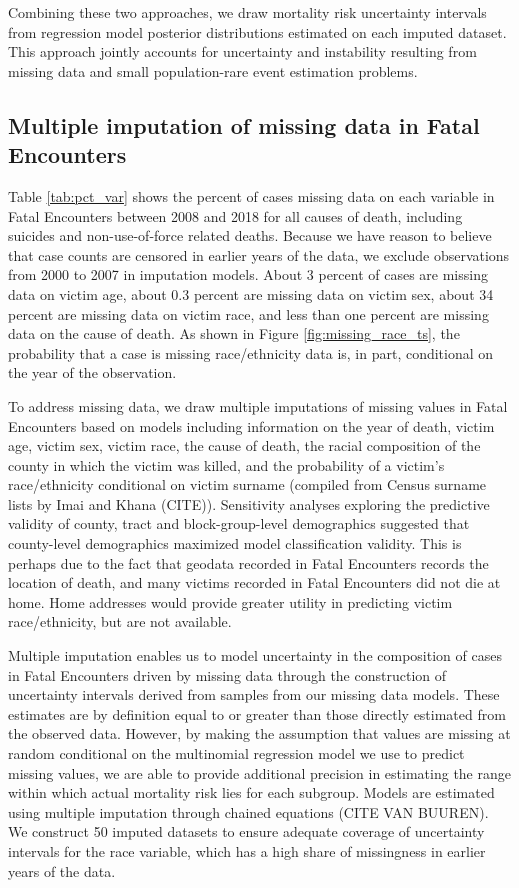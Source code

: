 \documentclass{article}
\begin{document}
Combining these two approaches, we draw mortality risk uncertainty intervals from regression model posterior distributions estimated on each imputed dataset. This approach jointly accounts for uncertainty and instability resulting from missing data and small population-rare event estimation problems. 

\subsection{Multiple imputation of missing data in Fatal Encounters}

Table \ref{tab:pct_var} shows the percent of cases missing data on each variable in Fatal Encounters between 2008 and 2018 for all causes of death, including suicides and non-use-of-force related deaths. Because we have reason to believe that case counts are censored in earlier years of the data, we exclude observations from 2000 to 2007 in imputation models. About 3 percent of cases are missing data on victim age, about 0.3 percent are missing data on victim sex, about 34 percent are missing data on victim race, and less than one percent are missing data on the cause of death. As shown in Figure \ref{fig:missing_race_ts}, the probability that a case is missing race/ethnicity data is, in part, conditional on the year of the observation. 



To address missing data, we draw multiple imputations of missing values in Fatal Encounters based on models including information on the year of death, victim age, victim sex, victim race, the cause of death, the racial composition of the county in which the victim was killed, and the probability of a victim's race/ethnicity conditional on victim surname (compiled from Census surname lists by Imai and Khana (CITE)). Sensitivity analyses exploring the predictive validity of county, tract and block-group-level demographics suggested that county-level demographics maximized model classification validity. This is perhaps due to the fact that geodata recorded in Fatal Encounters records the location of death, and many victims recorded in Fatal Encounters did not die at home. Home addresses would provide greater utility in predicting victim race/ethnicity, but are not available. 

Multiple imputation enables us to model uncertainty in the composition of cases in Fatal Encounters driven by missing data through the construction of uncertainty intervals derived from samples from our missing data models. These estimates are by definition equal to or greater than those directly estimated from the observed data. However, by making the assumption that values are missing at random conditional on the multinomial regression model we use to predict missing values, we are able to provide additional precision in estimating the range within which actual mortality risk lies for each subgroup. Models are estimated using multiple imputation through chained equations (CITE VAN BUUREN). We construct 50 imputed datasets to ensure adequate coverage of uncertainty intervals for the race variable, which has a high share of missingness in earlier years of the data. 
\end{document}
